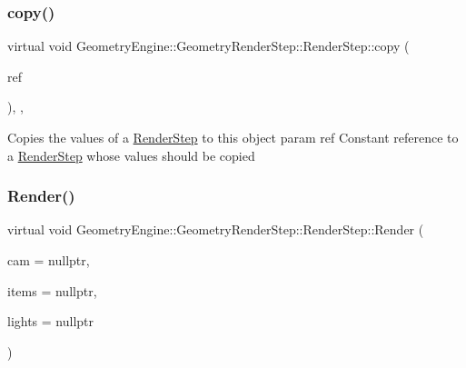 \mbox{\label{class_geometry_engine_1_1_geometry_render_step_1_1_render_step_afe0321446beeb4093dba701424ec1e8c}} 
\subsubsection{\texorpdfstring{copy()}{copy()}}
{\footnotesize\ttfamily virtual void Geometry\+Engine\+::\+Geometry\+Render\+Step\+::\+Render\+Step\+::copy (\begin{DoxyParamCaption}\item[{const \mbox{\hyperlink{class_geometry_engine_1_1_geometry_render_step_1_1_render_step}{Render\+Step}} \&}]{ref }\end{DoxyParamCaption})\hspace{0.3cm}{\ttfamily [inline]}, {\ttfamily [protected]}, {\ttfamily [virtual]}}

Copies the values of a \mbox{\hyperlink{class_geometry_engine_1_1_geometry_render_step_1_1_render_step}{Render\+Step}} to this object param ref Constant reference to a \mbox{\hyperlink{class_geometry_engine_1_1_geometry_render_step_1_1_render_step}{Render\+Step}} whose values should be copied \mbox{\label{class_geometry_engine_1_1_geometry_render_step_1_1_render_step_a9b054ee8f38304319a9d03ba3e173dcd}} 
\subsubsection{\texorpdfstring{Render()}{Render()}}
{\footnotesize\ttfamily virtual void Geometry\+Engine\+::\+Geometry\+Render\+Step\+::\+Render\+Step\+::\+Render (\begin{DoxyParamCaption}\item[{\mbox{\hyperlink{class_geometry_engine_1_1_geometry_world_item_1_1_geometry_camera_1_1_camera}{Geometry\+World\+Item\+::\+Geometry\+Camera\+::\+Camera}} $\ast$}]{cam = {\ttfamily nullptr},  }\item[{std\+::unordered\+\_\+set$<$ \mbox{\hyperlink{class_geometry_engine_1_1_geometry_world_item_1_1_geometry_item_1_1_geometry_item}{Geometry\+World\+Item\+::\+Geometry\+Item\+::\+Geometry\+Item}} $\ast$ $>$ $\ast$}]{items = {\ttfamily nullptr},  }\item[{std\+::unordered\+\_\+set$<$ \mbox{\hyperlink{class_geometry_engine_1_1_geometry_world_item_1_1_geometry_light_1_1_light}{Geometry\+World\+Item\+::\+Geometry\+Light\+::\+Light}} $\ast$ $>$ $\ast$}]{lights = {\ttfamily nullptr} }\end{DoxyParamCaption})\hspace{0.3cm}{\ttfamily [pure virtual]}}


